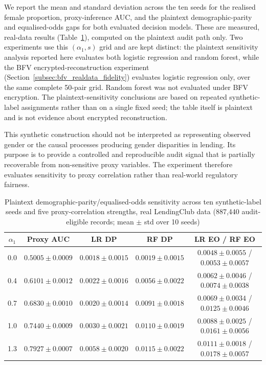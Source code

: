 \documentclass[a4paper,fleqn]{cas-dc}
\begin{document}
We report the mean and standard deviation across the ten seeds for the realised female proportion, proxy-inference AUC, and the plaintext demographic-parity and equalised-odds gaps for both evaluated decision models. These are measured, real-data results (Table~\ref{tab:alpha_seed_sensitivity}), computed on the plaintext audit path only. Two experiments use this $(\alpha_1,s)$ grid and are kept distinct: the plaintext sensitivity analysis reported here evaluates both logistic regression and random forest, while the BFV encrypted-reconstruction experiment (Section~\ref{subsec:bfv_realdata_fidelity}) evaluates logistic regression only, over the same complete 50-pair grid. Random forest was not evaluated under BFV encryption. The plaintext-sensitivity conclusions are based on repeated synthetic-label assignments rather than on a single fixed seed; the table itself is plaintext and is not evidence about encrypted reconstruction.

This synthetic construction should not be interpreted as representing observed gender or the causal processes producing gender disparities in lending. Its purpose is to provide a controlled and reproducible audit signal that is partially recoverable from non-sensitive proxy variables. The experiment therefore evaluates sensitivity to proxy correlation rather than real-world regulatory fairness.

\begin{table}[htbp]
\centering
\caption{Plaintext demographic-parity/equalised-odds sensitivity across ten synthetic-label seeds and five proxy-correlation strengths, real LendingClub data (887{,}440 audit-eligible records; mean $\pm$ std over 10 seeds)}
\label{tab:alpha_seed_sensitivity}
\scriptsize
\begin{tabular}{|c|c|c|c|c|}
\hline
\textbf{$\alpha_1$} & \textbf{Proxy AUC} & \textbf{LR DP} & \textbf{RF DP} & \textbf{LR EO / RF EO} \\
\hline
0.0 & $0.5005\pm0.0009$ & $0.0018\pm0.0015$ & $0.0019\pm0.0015$ & $0.0048\pm0.0055$ / $0.0053\pm0.0057$ \\
0.4 & $0.6101\pm0.0012$ & $0.0022\pm0.0016$ & $0.0056\pm0.0022$ & $0.0062\pm0.0046$ / $0.0074\pm0.0038$ \\
0.7 & $0.6830\pm0.0010$ & $0.0020\pm0.0014$ & $0.0091\pm0.0018$ & $0.0069\pm0.0034$ / $0.0125\pm0.0046$ \\
1.0 & $0.7440\pm0.0009$ & $0.0030\pm0.0021$ & $0.0110\pm0.0019$ & $0.0088\pm0.0025$ / $0.0161\pm0.0056$ \\
1.3 & $0.7927\pm0.0007$ & $0.0058\pm0.0020$ & $0.0115\pm0.0022$ & $0.0111\pm0.0018$ / $0.0178\pm0.0057$ \\
\hline
\end{tabular}
\end{table}
\end{document}
